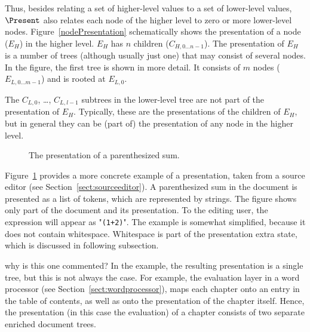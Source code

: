 Thus, besides relating a set of higher-level values to a set of lower-level values, $\Present$ also relates each node of the higher level to zero or more lower-level nodes. Figure~\ref{nodePresentation} schematically shows the presentation of a node ($E_H$) in the higher level. $E_H$ has $n$ children ($C_{H,0\dots n-1}$). The presentation of $E_H$ is a number of trees (although usually just one) that may consist of several nodes. In the figure, the first tree is shown in more detail. It consists of $m$ nodes ($E_{L,0\dots m-1}$) and is rooted at $E_{L,0}$. 

The $C_{L,0}$, \dots, $C_{L,l-1}$ subtrees in the lower-level tree are not part of the presentation of $E_H$. Typically, these are the presentations of the children of $E_H$, but in general they can be (part of) the presentation of any node in the higher level. 

\begin{figure}
\begin{center}
\begin{center}
%
%
\end{center}
\caption{The presentation of a parenthesized sum.}\label{presentExample} 
\end{center}
\end{figure}

Figure~\ref{presentExample} provides a more concrete example of a presentation, taken from a source editor (see Section~\ref{sect:sourceeditor}). A parenthesized sum in the document is presented as a list of tokens, which are represented by strings.  The figure shows only part of the document and its presentation. To the editing user, the expression will appear as "{\tt (1+2)}". The example is somewhat simplified, because it does not contain whitespace. Whitespace is part of the presentation extra state, which is discussed in following subsection.

\bc  why is this one commented?
In the example, the resulting presentation is a single tree, but this is not always the case. For example, the evaluation layer in a word processor (see Section~\ref{sect:wordprocessor}), maps each chapter onto an entry in the table of contents, as well as onto the presentation of the chapter itself. Hence, the presentation (in this case the evaluation) of a chapter consists of two separate enriched document trees.
\ec






